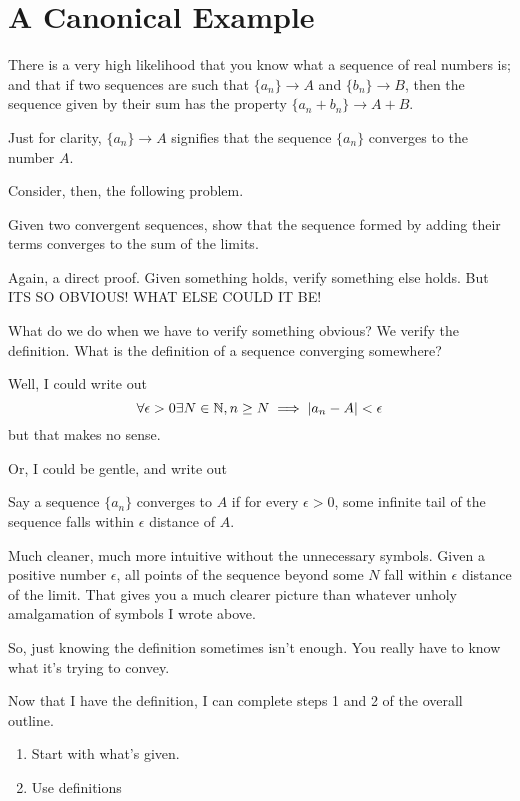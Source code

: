 \section*{A Canonical Example}
There is a very high likelihood that you know what a sequence of real numbers is; and that if two sequences are such that $\{a_n\} \rightarrow A$ and $\{b_n\} \rightarrow B$, then the sequence given by their sum has the property $\{a_n + b_n\} \rightarrow A + B$.

Just for clarity, $\{a_n\} \rightarrow A$ signifies that the sequence $\{a_n\}$ converges to the number $A$.

Consider, then, the following problem.

\begin{SNP}{\xmp}Given two convergent sequences, show that the sequence formed by adding their terms converges to the sum of the limits.\end{SNP}

Again, a direct proof. Given something holds, verify something else holds. But ITS SO OBVIOUS! WHAT ELSE COULD IT BE!

What do we do when we have to verify something obvious? We verify the definition. What is the definition of a sequence converging somewhere?

Well, I could write out
$$
\forall \space \epsilon > 0 \space \exists \space N \in \mathbb N, \space n \geq N \implies |a_n - A| < \epsilon
$$
but that makes no sense.

Or, I could be gentle, and write out
\begin{SNP}{\dfn} Say a sequence $\{a_n\}$ converges to $A$ if for every $\epsilon > 0$, some infinite tail of the sequence falls within $\epsilon$ distance of $A$.\end{SNP}

Much cleaner, much more intuitive without the unnecessary symbols. Given a positive number $\epsilon$, all points of the sequence beyond some $N$ fall within $\epsilon$ distance of the limit. That gives you a much clearer picture than whatever unholy amalgamation of symbols I wrote above.

So, just knowing the definition sometimes isn't enough. You really have to know what it's trying to convey.

Now that I have the definition, I can complete steps 1 and 2 of the overall outline.

\begin{enumerate}
    \item Start with what's given.
    \item Use definitions
\end{enumerate}

